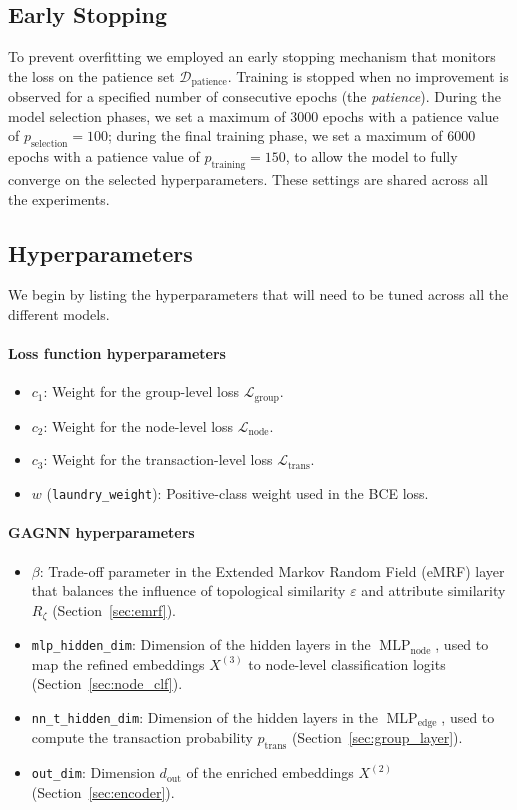 \subsection{Early Stopping}
To prevent overfitting we employed an early stopping mechanism that monitors the loss on the patience set \(\mathcal{D}_\text{patience}\). Training is stopped when no improvement is observed for a specified number of consecutive epochs (the \emph{patience}). During the model selection phases, we set a maximum of $3000$ epochs with a patience value of $p_{\text{selection}}=100$; during the final training phase, we set a maximum of $6000$ epochs with a patience value of $p_{\text{training}}=150 $, to allow the model to fully converge on the selected hyperparameters. These settings are shared across all the experiments.

\subsection{Hyperparameters}
We begin by listing the hyperparameters that will need to be tuned across all the different models.
\paragraph{Loss function hyperparameters} 
\begin{itemize}
  \item \(c_1\): Weight for the group-level loss \(\mathcal{L}_{\text{group}}\).
  \item \(c_2\): Weight for the node-level loss \(\mathcal{L}_{\text{node}}\).
  \item \(c_3\): Weight for the transaction-level loss \(\mathcal{L}_{\text{trans}}\).
  \item \(w\) (\texttt{laundry\_weight}): Positive-class weight used in the BCE loss.
\end{itemize}
\paragraph{GAGNN hyperparameters}
\begin{itemize}
  \item \(\beta\): Trade-off parameter in the Extended Markov Random Field (eMRF) layer that balances the influence of topological similarity \(\varepsilon\) and attribute similarity \(R_\zeta\) (Section~\ref{sec:emrf}).
  \item \texttt{mlp\_hidden\_dim}: Dimension of the hidden layers in the \(\operatorname{MLP}_{\text{node}}\), used to map the refined embeddings \(X^{(3)}\) to node-level classification logits (Section~\ref{sec:node_clf}).
  \item \texttt{nn\_t\_hidden\_dim}: Dimension of the hidden layers in the \(\operatorname{MLP}_{\text{edge}}\), used to compute the transaction probability \(p_{\text{trans}}\) (Section~\ref{sec:group_layer}).
  \item \texttt{out\_dim}: Dimension \(d_{\text{out}}\) of the enriched embeddings \(X^{(2)}\) (Section~\ref{sec:encoder}).
\end{itemize}
